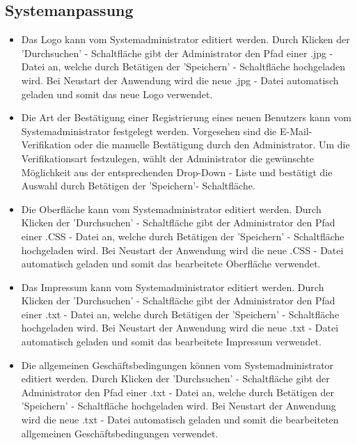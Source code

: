 \documentclass[a4paper]{scrreprt}
\begin{document}
\subsection{Systemanpassung}
\begin{itemize}
	\item {}
	Das Logo kann vom Systemadministrator editiert werden. Durch Klicken der 'Durchsuchen' - Schaltfläche gibt der Administrator den Pfad einer .jpg - Datei an, welche durch Betätigen der 'Speichern' - Schaltfläche hochgeladen wird. Bei Neustart der Anwendung wird die neue .jpg - Datei automatisch geladen und somit das neue Logo verwendet.
	\item {}
	Die Art der Bestätigung einer Registrierung eines neuen Benutzers kann vom Systemadministrator festgelegt werden.
	Vorgesehen sind die E-Mail-Verifikation oder die manuelle Bestätigung durch den Administrator. Um die Verifikationsart festzulegen, wählt der Administrator die gewünschte Möglichkeit aus der entsprechenden Drop-Down - Liste und bestätigt die Auswahl durch Betätigen der 'Speichern'- Schaltfläche.
	\item {}
	Die Oberfläche kann vom Systemadministrator editiert werden. Durch Klicken der 'Durchsuchen' - Schaltfläche gibt der Administrator den Pfad einer .CSS - Datei an, welche durch Betätigen der 'Speichern' - Schaltfläche hochgeladen wird. Bei Neustart der Anwendung wird die neue .CSS - Datei automatisch geladen und somit das bearbeitete Oberfläche verwendet.
	\item {}
	Das Impressum kann vom Systemadministrator editiert werden. Durch Klicken der 'Durchsuchen' - Schaltfläche gibt der Administrator den Pfad einer .txt - Datei an, welche durch Betätigen der 'Speichern' - Schaltfläche hochgeladen wird. Bei Neustart der Anwendung wird die neue .txt - Datei automatisch geladen und somit das bearbeitete Impressum verwendet.
	\item {}
	Die allgemeinen Geschäftsbedingungen können vom Systemadministrator editiert werden. Durch Klicken der 'Durchsuchen' - Schaltfläche gibt der Administrator den Pfad einer .txt - Datei an, welche durch Betätigen der 'Speichern' - Schaltfläche hochgeladen wird. Bei Neustart der Anwendung wird die neue .txt - Datei automatisch geladen und somit die bearbeiteten allgemeinen Geschäftsbedingungen verwendet.
\end{itemize}
		
\end{document}

